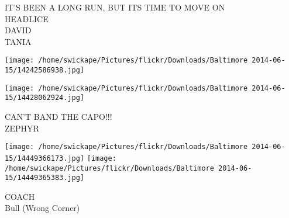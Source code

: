 \documentclass[10pt,letterpaper]{article}
\begin{document}
IT'S BEEN A LONG RUN, BUT ITS TIME TO MOVE ON\\
HEADLICE\\
DAVID\\
TANIA\\
\pagebreak

\texttt{[image: /home/swickape/Pictures/flickr/Downloads/Baltimore 2014-06-15/14242586938.jpg]}

\vspace{0.25in}
\texttt{[image: /home/swickape/Pictures/flickr/Downloads/Baltimore 2014-06-15/14428062924.jpg]}

CAN'T BAND THE CAPO!!!\\
ZEPHYR\\
\pagebreak

\texttt{[image: /home/swickape/Pictures/flickr/Downloads/Baltimore 2014-06-15/14449366173.jpg]}
\texttt{[image: /home/swickape/Pictures/flickr/Downloads/Baltimore 2014-06-15/14449365383.jpg]}

COACH\\
Bull (Wrong Corner)\\
\pagebreak
\end{document}
